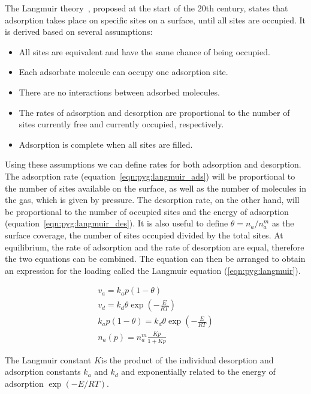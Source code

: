 The Langmuir theory~\cite{langmuirAdsorptionGasesPlane1918a}, 
proposed at the start of the 20th century, states that
adsorption takes place on specific sites on a surface, until 
all sites are occupied. 
It is derived based on several assumptions:

\begin{itemize}
    
    \item All sites are equivalent and have the same chance of being occupied.
    \item Each adsorbate molecule can occupy one adsorption site.
    \item There are no interactions between adsorbed molecules.
    \item The rates of adsorption and desorption are proportional to the number
    of sites currently free and currently occupied, respectively.
    \item Adsorption is complete when all sites are filled.
    
\end{itemize}

Using these assumptions we can define rates for both adsorption and
desorption. The adsorption rate (equation~\ref{eqn:pyg:langmuir_ads}) 
will be proportional to the number of sites available on the surface, 
as well as the number of molecules in the gas, which is given by pressure.
The desorption rate, on the other hand, will be proportional to the 
number of occupied sites and the energy of adsorption (equation~\ref{eqn:pyg:langmuir_des}).
It is also useful to define \(\theta = n_a/n_a^m\) as the surface coverage,
the number of sites occupied divided by the total sites. At equilibrium, 
the rate of adsorption and the rate of
desorption are equal, therefore the two equations can be combined.
The equation can then be arranged to obtain an expression for the 
loading called the Langmuir equation (\ref{eqn:pyg:langmuir}).

\begin{gather}
    v_a = k_a p (1 - \theta) \label{eqn:pyg:langmuir_ads} \\
    v_d = k_d \theta \exp{(-\frac{E}{RT})} \label{eqn:pyg:langmuir_des} \\
    k_a p (1 - \theta) = k_d \theta \exp{(-\frac{E}{RT})} \\
    n_a(p) = n_a^m \frac{Kp}{1+Kp} \label{eqn:pyg:langmuir}
\end{gather}

The Langmuir constant \(K\)is the product of the individual desorption 
and adsorption constants \(k_a\) and \(k_d\) and exponentially 
related to the energy of adsorption \(\exp{(-{E}/{RT})}\).


